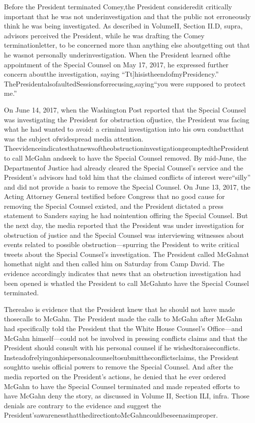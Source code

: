 {Before the President terminated Comey,the President consideredit critically important that he was not underinvestigation and that the public not erroneously think he was being investigated. As described in VolumeII, Section II.D, supra, advisors perceived the President, while he was drafting the Comey terminationletter, to be concerned more than anything else aboutgetting out that he wasnot personally underinvestigation. When the President learned ofthe appointment of the Special Counsel on May 17, 2017, he expressed further concern aboutthe investigation, saying “Tt]hisistheendofmyPresidency.” ThePresidentalsofaultedSessionsforrecusing,saying“you were supposed to protect me.”

On June 14, 2017, when the Washington Post reported that the Special Counsel was investigating the President for obstruction ofjustice, the President was facing what he had wanted to avoid: a criminal investigation into his own conductthat was the subject ofwidespread media attention. TheevidenceindicatesthatnewsoftheobstructioninvestigationpromptedthePresident to call McGahn andseek to have the Special Counsel removed. By mid-June, the Departmentof Justice had already cleared the Special Counsel’s service and the President’s advisors had told him that the claimed conflicts of interest were“silly” and did not provide a basis to remove the Special Counsel. On June 13, 2017, the Acting Attorney General testified before Congress that no good cause for removing the Special Counsel existed, and the President dictated a press statement to Sanders saying he had nointention offiring the Special Counsel. But the next day, the media reported that the President was under investigation for obstruction of justice and the Special Counsel was interviewing witnesses about events related to possible obstruction—spurring the President to write critical tweets about the Special Counsel’s investigation. The President called McGahnat homethat night and then called him on Saturday from Camp David. The evidence accordingly indicates that news that an obstruction investigation had been opened is whatled the President to call McGahnto have the Special Counsel terminated.

Therealso is evidence that the President knew that he should not have made thosecalls to McGahn. The President made the calls to McGahn after McGahn had specifically told the President that the White House Counsel’s Office—and McGahn himself—could not be involved in pressing conflicts claims and that the President should consult with his personal counsel if he wishedtoraiseconflicts. Insteadofrelyingonhispersonalcounseltosubmittheconflictsclaims, the President soughtto usehis official powers to remove the Special Counsel. And after the media reported on the President’s actions, he denied that he ever ordered McGahn to have the Special Counsel terminated and made repeated efforts to have McGahn deny the story, as discussed in Volume II, Section ILI, infra. Those denials are contrary to the evidence and suggest the President’sawarenessthatthedirectiontoMcGahncouldbeseenasimproper.

}
